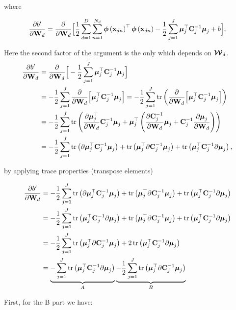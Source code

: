 	where
	
	\begin{align}
	\frac{\partial b'}{\dWjIn} = \frac{\partial}{\dWjIn}\Big[ \frac{1}{2} \sum_{d=1}^{D}\sum_{n=1}^{N_d}\phixnd^\top\phixnd -\frac{1}{2}\sum_{j=1}^{J}\muJ^\top\Cin^{-1}\muJ +b \Big],
	\end{align}
	
	Here the second factor of the argument is the only which depends on $\projMat$.
	\begin{align}
	\frac{\partial b'}{\dWjIn} &= \frac{\partial}{\dWjIn}\Big[-\frac{1}{2}\sum_{j=1}^{J}\muJ^\top\Cin^{-1}\muJ \Big] \notag \\
	&=-\frac{1}{2}\sum_{j=1}^{J}\frac{\partial}{\dWjIn}\Big[\muJ^\top\Cin^{-1}\muJ \Big] =-\frac{1}{2}\sum_{j=1}^{J}\tr\left(\frac{\partial}{\dWjIn}\Big[\muJ^\top\Cin^{-1}\muJ \Big]\right) \notag \\
	&=-\frac{1}{2}\sum_{j=1}^{J}\tr\left(\frac{\partial \muJ^\top}{\dWjIn}\Cin^{-1}\muJ + \muJ^\top\left(\frac{\partial \Cin^{-1}}{\dWjIn}\muJ+\Cin^{-1}\frac{\partial \muJ}{\dWjIn}\right)\right) \notag \\
	& = -\frac{1}{2}\sum_{j=1}^{J} \tr\left(\partial \muJ^\top\Cin^{-1}\muJ\right) + \tr\left( \muJ^\top\partial\Cin^{-1}\muJ\right) + \tr\left( \muJ^\top\Cin^{-1}\partial\muJ\right),
	\end{align}
	
	by applying trace properties (transpose elements)
	
	\begin{align}
	\frac{\partial b'}{\dWjIn} &= -\frac{1}{2}\sum_{j=1}^{J} \tr\left(\partial \muJ^\top\Cin^{-1}\muJ\right) + \tr\left( \muJ^\top\partial\Cin^{-1}\muJ\right) + \tr\left( \muJ^\top\Cin^{-1}\partial\muJ\right) \notag \\
	&=  -\frac{1}{2}\sum_{j=1}^{J} \tr\left( \muJ^\top\Cin^{-1}\partial\muJ\right) + \tr\left( \muJ^\top\partial\Cin^{-1}\muJ\right) + \tr\left( \muJ^\top\Cin^{-1}\partial\muJ\right) \notag \\
	&= -\frac{1}{2}\sum_{j=1}^{J} \tr\left( \muJ^\top\partial\Cin^{-1}\muJ\right) + 2\tr\left( \muJ^\top\Cin^{-1}\partial\muJ\right) \notag\\
	&=  \underbrace{-\sum_{j=1}^{J}\tr\left( \muJ^\top\Cin^{-1}\partial\muJ\right)}_{A} \underbrace{-\frac{1}{2}\sum_{j=1}^{J} \tr\left( \muJ^\top\partial\Cin^{-1}\muJ\right)}_{B} 
	\end{align}
	
	First, for the B part we have:
	
